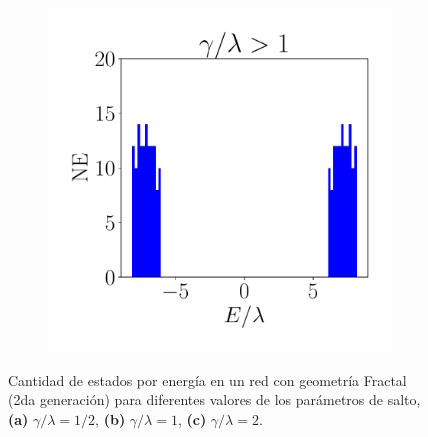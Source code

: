 \begin{figure}[h!]
\begin{subfigure}[b!]{0.3 \textwidth}
     \end{subfigure}\hspace*{1em}
     \begin{subfigure}[b!]{0.3 \textwidth}
         \caption{}
         \includegraphics[width=\textwidth]{Imagenes/Resultados_Hoti_Fractal/bars_square3.pdf}
     \end{subfigure}\hspace*{1em}\vspace*{-0.5em}
        \caption{Cantidad de estados por energía en un red con geometría Fractal (2da generación) para diferentes valores de los parámetros de salto, \textbf{(a)} $\gamma /\lambda = 1/2$, \textbf{
        (b)} $\gamma /\lambda = 1$, \textbf{(c)} $\gamma /\lambda = 2$.}
    \label{fig:Dos_fractal}
\end{figure}